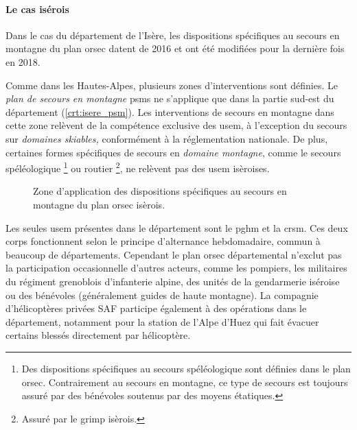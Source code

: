 \paragraph{Le cas isérois}

Dans le cas du département de l'Isère, les dispositions spécifiques au
secours en montagne du plan \ac{orsec} datent de 2016 et ont été
modifiées pour la dernière fois en 2018.

Comme dans les Hautes-Alpes, plusieurs zones d'interventions sont
définies. Le \emph{plan de secours en montagne} \acp{psm} ne
s'applique que dans la partie sud-est du département
(\autoref{crt:isere_psm}). Les interventions de secours en montagne
dans cette zone relèvent de la compétence exclusive des \ac{usem}, à
l'exception du secours sur \emph{domaines skiables,} conformément à la
réglementation nationale. De plus, certaines formes spécifiques de
secours en \emph{domaine montagne}, comme le secours spéléologique
\footnote{Des dispositions spécifiques au secours spéléologique sont
  définies dans le plan \ac{orsec}. Contrairement au secours en
  montagne, ce type de secours est toujours assuré par des bénévoles
  soutenus par des moyens étatiques.} ou routier \footnote{Assuré par
  le \ac{grimp} isèrois.}, ne relèvent pas des \ac{usem} isèroises.

\begin{figure}
  \centering
  
  \caption{Zone d'application des dispositions spécifiques au secours
    en montagne du plan \ac{orsec} isèrois.}
  \label{crt:isere_psm}
\end{figure}

Les seules \ac{usem} présentes dans le département sont le \ac{pghm}
et la \ac{crsm}. Ces deux corps fonctionnent selon le principe
d'alternance hebdomadaire, commun à beaucoup de
départements. Cependant le plan \ac{orsec} départemental n’exclut pas
la participation occasionnelle d'autres acteurs, comme les pompiers,
les militaires du régiment grenoblois d’infanterie alpine, des unités
de la gendarmerie iséroise ou des bénévoles (généralement guides de
haute montagne).
La compagnie d'hélicoptères privées SAF participe également à des
opérations dans le département, notamment pour la station de l'Alpe
d'Huez qui fait évacuer certains blessés directement par hélicoptère.

